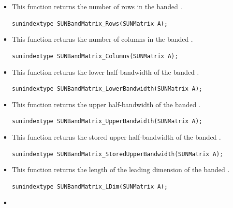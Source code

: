 \begin{itemize}
\item {}

  This function returns the number of rows in the banded .
 
  \verb|sunindextype SUNBandMatrix_Rows(SUNMatrix A);|


\item {}

  This function returns the number of columns in the banded .
 
  \verb|sunindextype SUNBandMatrix_Columns(SUNMatrix A);|


\item {}

  This function returns the lower half-bandwidth of the banded .
 
  \verb|sunindextype SUNBandMatrix_LowerBandwidth(SUNMatrix A);|


\item {}

  This function returns the upper half-bandwidth of the banded .
 
  \verb|sunindextype SUNBandMatrix_UpperBandwidth(SUNMatrix A);|


\item {}

  This function returns the stored upper half-bandwidth of the banded .
 
  \verb|sunindextype SUNBandMatrix_StoredUpperBandwidth(SUNMatrix A);|


\item {}

  This function returns the length of the leading dimension of the banded .
 
  \verb|sunindextype SUNBandMatrix_LDim(SUNMatrix A);|


\item {}


\end{itemize}
